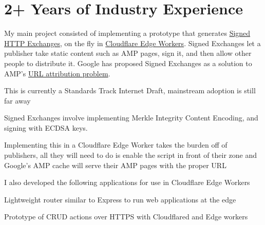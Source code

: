 \documentclass[letterpaper]{deedy-resume} %
\begin{document}
\begin{minipage}[t]{0.64\textwidth} %


\section{2+ Years of Industry Experience}


\sectionspace
My main project consisted of implementing a prototype that generates \href{https://tools.ietf.org/html/draft-yasskin-http-origin-signed-responses-04}{Signed HTTP Exchanges}, on the fly in \href{https://developers.cloudflare.com/workers/}{Cloudflare Edge Workers}. Signed Exchanges let a publisher take static content such as AMP pages, sign it, and then allow other people to distribute it. Google has proposed Signed Exchanges as a solution to AMP's \href{https://80x24.net/post/the-problem-with-amp/}{URL attribution problem}. 
\sectionspace
\begin {tightitemize}
\item This is currently a Standards Track Internet Draft, mainstream adoption is still far away
\item Signed Exchanges involve implementing Merkle Integrity Content Encoding, and signing with ECDSA keys.
\item Implementing this in a Cloudflare Edge Worker takes the burden off of publishers, all they will need to do is enable the script in front of their zone and Google's AMP cache will serve their AMP pages with the proper URL
\end {tightitemize}
I also developed the following applications for use in Cloudflare Edge Workers
\begin {tightitemize}
\item Lightweight router similar to Express to run web applications at the edge
\item Prototype of CRUD actions over HTTPS with Cloudflared and Edge workers
\end {tightitemize}
\sectionspace
{}


\end{minipage}
\end{document}
